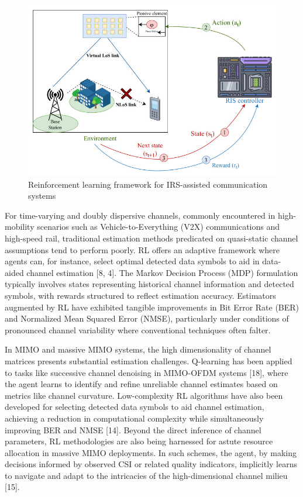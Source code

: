 \documentclass[journal,twocolumn]{IEEEtran}
\begin{document}
\begin{figure}[h!]
\centering
\includegraphics[width=0.8\columnwidth]{Reinforcement learning model.png}
\caption{Reinforcement learning framework for IRS-assisted communication systems}
\label{fig:rl_irs_framework}
\end{figure}

For time-varying and doubly dispersive channels, commonly encountered in high-mobility scenarios such as Vehicle-to-Everything (V2X) communications and high-speed rail, traditional estimation methods predicated on quasi-static channel assumptions tend to perform poorly. RL offers an adaptive framework where agents can, for instance, select optimal detected data symbols to aid in data-aided channel estimation [8, 4]. The Markov Decision Process (MDP) formulation typically involves states representing historical channel information and detected symbols, with rewards structured to reflect estimation accuracy. Estimators augmented by RL have exhibited tangible improvements in Bit Error Rate (BER) and Normalized Mean Squared Error (NMSE), particularly under conditions of pronounced channel variability where conventional techniques often falter.

In MIMO and massive MIMO systems, the high dimensionality of channel matrices presents substantial estimation challenges. Q-learning has been applied to tasks like successive channel denoising in MIMO-OFDM systems [18], where the agent learns to identify and refine unreliable channel estimates based on metrics like channel curvature. Low-complexity RL algorithms have also been developed for selecting detected data symbols to aid channel estimation, achieving a reduction in computational complexity while simultaneously improving BER and NMSE [14]. Beyond the direct inference of channel parameters, RL methodologies are also being harnessed for astute resource allocation in massive MIMO deployments. In such schemes, the agent, by making decisions informed by observed CSI or related quality indicators, implicitly learns to navigate and adapt to the intricacies of the high-dimensional channel milieu [15].
\end{document}
